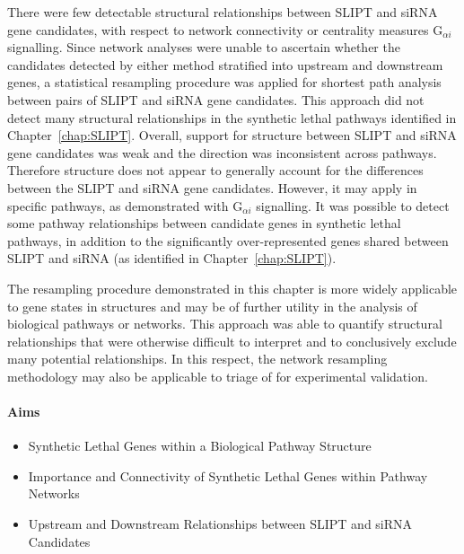 There were few detectable structural relationships between \gls{SLIPT} and \gls{siRNA} gene candidates, with respect to network connectivity or \gls{centrality} measures G$_{\alpha i}$ signalling. Since network analyses were unable to ascertain whether the candidates detected by either method stratified into upstream and downstream genes, %
%
a statistical resampling procedure was applied for \gls{shortest path} analysis between pairs of \gls{SLIPT} and \gls{siRNA} gene candidates. %
This approach did not detect many structural relationships in the \gls{synthetic lethal} \glspl{pathway} identified in Chapter~\ref{chap:SLIPT}. Overall, support for  structure between \gls{SLIPT} and \gls{siRNA} gene candidates was weak and the direction was inconsistent across \glspl{pathway}. Therefore  structure does not appear to generally account for the differences between the \gls{SLIPT} and \gls{siRNA} gene candidates. However, it may apply in specific \glspl{pathway}, as demonstrated with G$_{\alpha i}$ signalling. It was possible to detect some \gls{pathway} relationships between candidate genes in \gls{synthetic lethal} \glspl{pathway}, in addition to the significantly over-represented genes shared between \gls{SLIPT} and \gls{siRNA} (as identified in  Chapter~\ref{chap:SLIPT}).

The resampling procedure demonstrated in this chapter is more widely applicable to gene states in  structures and may be of further utility in the analysis of biological \glspl{pathway} or networks. This approach was able to quantify structural relationships that were otherwise difficult to interpret and to conclusively exclude many potential relationships. In this respect, the network resampling methodology may also be applicable to triage of  for experimental validation.

\clearpage

\iffalse
\paragraph{Aims}

  \begin{itemize}
   \item Synthetic Lethal Genes within a Biological Pathway Structure
   
   \bigskip
   
   \item Importance and Connectivity of Synthetic Lethal Genes within Pathway Networks
   
   \bigskip
   
   \item Upstream and Downstream Relationships between SLIPT and \gls{siRNA} Candidates
  \end{itemize}

